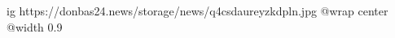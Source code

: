  
 
 
 
 

\ifcmt
  ig https://donbas24.news/storage/news/q4csdaureyzkdpln.jpg
  @wrap center
  @width 0.9
\fi
